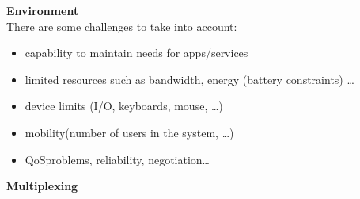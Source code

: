 \vspace{1em}
\textbf{Environment}\\[0.2cm]
There are some challenges to take into account:
\begin{itemize}
    \item capability to maintain needs for apps/services
    \item limited resources such as bandwidth, energy (battery constraints) \dots
    \item device limits (I/O, keyboards, mouse, \dots)
    \item mobility(number of users in the system, \dots)
    \item QoS\footQoS problems, reliability, negotiation\dots
\end{itemize}
\vspace{1em}
\textbf{Multiplexing}
